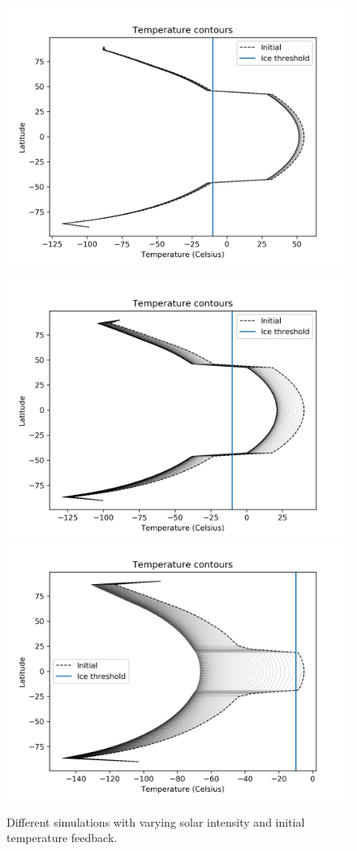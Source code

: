 \documentclass{article}
\begin{document}
\begin{figure}
\includegraphics[scale=0.4]{tcont_514.png} 
\end{figure}
\begin{figure}
\includegraphics[scale=0.4]{tcont_516.png} 
\includegraphics[scale=0.4]{tcont_518.png} 
\caption{Different simulations with varying solar intensity and initial temperature feedback.}
\end{figure}
\end{document}
